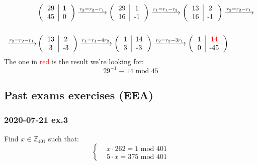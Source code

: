 \documentclass[11pt, a4paper]{article}
\newcommand{\mymod}{
    \text{ mod }
}
\begin{document}
\begin{align*}
    &\left(\begin{tabular}{c|c}
        29&1\\
        45&0
    \end{tabular}\right)\xrightarrow[]{r_2=r_2-r_1}
    \left(\begin{tabular}{c|c}
        29&1\\
        16&-1
    \end{tabular}\right)\xrightarrow[]{r_1=r_1-r_2}
    \left(\begin{tabular}{c|c}
        13&2\\
        16&-1
    \end{tabular}\right)\xrightarrow[]{r_2=r_2-r_1}\\\\\xrightarrow[]{r_2=r_2-r_1}
    &\left(\begin{tabular}{c|c}
        13&2\\
        3&-3
    \end{tabular}\right)\xrightarrow[]{r_1=r_1-4r_2}
    \left(\begin{tabular}{c|c}
        1&14\\
        3&-3
    \end{tabular}\right)\xrightarrow[]{r_2=r_2-3r_1}
    \left(\begin{tabular}{c|c}
        1&\textcolor{red}{14}\\
        0&-45
    \end{tabular}\right)
\end{align*}
The one in \textcolor{red}{red} is the result we're looking for:
$$29^{-1}\equiv14\mymod45$$


\newpage
\subsection{Past exams exercises (EEA)}
\subsubsection{2020-07-21 ex.3}
Find $x\in\mathbb{Z}_{401}$ such that:
\begin{equation*}
  \left\{
    \begin{aligned}
      & x\cdot262=1\mymod401 \\
      & 5\cdot x=375\mymod401
    \end{aligned}
  \right.
\end{equation*}
\end{document}
